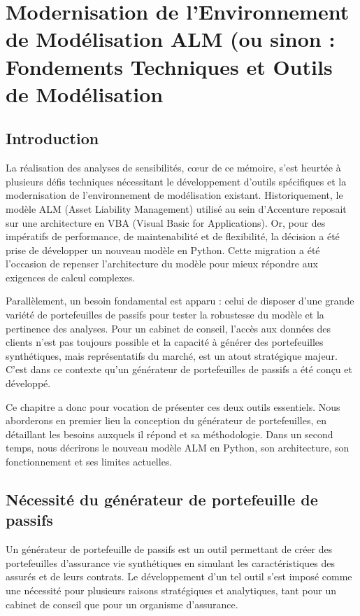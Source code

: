 \chapter{Modernisation de l'Environnement de Modélisation ALM (ou sinon : Fondements Techniques et Outils de Modélisation}

\section*{Introduction}

La réalisation des analyses de sensibilités, cœur de ce mémoire, s'est heurtée à plusieurs défis techniques nécessitant le développement d'outils spécifiques et la modernisation de l'environnement de modélisation existant. Historiquement, le modèle ALM (Asset Liability Management) utilisé au sein d'Accenture reposait sur une architecture en VBA (Visual Basic for Applications). Or, pour des impératifs de performance, de maintenabilité et de flexibilité, la décision a été prise de développer un nouveau modèle en Python. Cette migration a été l'occasion de repenser l'architecture du modèle pour mieux répondre aux exigences de calcul complexes.

Parallèlement, un besoin fondamental est apparu : celui de disposer d'une grande variété de portefeuilles de passifs pour tester la robustesse du modèle et la pertinence des analyses. Pour un cabinet de conseil, l'accès aux données des clients n'est pas toujours possible et la capacité à générer des portefeuilles synthétiques, mais représentatifs du marché, est un atout stratégique majeur. C'est dans ce contexte qu'un générateur de portefeuilles de passifs a été conçu et développé.

Ce chapitre a donc pour vocation de présenter ces deux outils essentiels. Nous aborderons en premier lieu la conception du générateur de portefeuilles, en détaillant les besoins auxquels il répond et sa méthodologie. Dans un second temps, nous décrirons le nouveau modèle ALM en Python, son architecture, son fonctionnement et ses limites actuelles.

\section{Nécessité du générateur de portefeuille de passifs}

Un générateur de portefeuille de passifs est un outil permettant de créer des portefeuilles d'assurance vie synthétiques en simulant les caractéristiques des assurés et de leurs contrats. Le développement d'un tel outil s'est imposé comme une nécessité pour plusieurs raisons stratégiques et analytiques, tant pour un cabinet de conseil que pour un organisme d'assurance.

